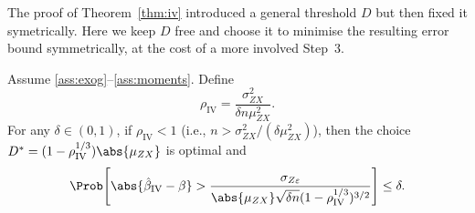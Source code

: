 The proof of Theorem~\ref{thm:iv} introduced a general threshold $D$ but then
fixed it symetrically. Here we keep $D$ free and choose it to minimise the
resulting error bound symmetrically, at the cost of a more involved Step~3.

\begin{theorem}
\label{thm:iv_opt}
    Assume \ref{ass:exog}--\ref{ass:moments}. Define
    \[
        \rho_\mathrm{IV} = \frac{\sigma_{ZX}^2}{\delta n\mu_{ZX}^2}.
    \]
    For any $\delta\in(0,1)$, if $\rho_\mathrm{IV} < 1$ (i.e., $n > \sigma_{ZX}^2/(\delta\mu_{ZX}^2)$),
    then the choice $D^* = (1-\rho_\mathrm{IV}^{1/3})\abs{\mu_{ZX}}$ is optimal and
    \begin{equation}
    \label{eq:iv_bound_opt}
        \Prob\!\left[\abs{\hat{\beta}_{\mathrm{IV}} - \beta} > \frac{\sigma_{Z\varepsilon}}{\abs{\mu_{ZX}}\sqrt{\delta n}(1-\rho_\mathrm{IV}^{1/3})^{3/2}} \right] \leq \delta.
    \end{equation}
\end{theorem}

